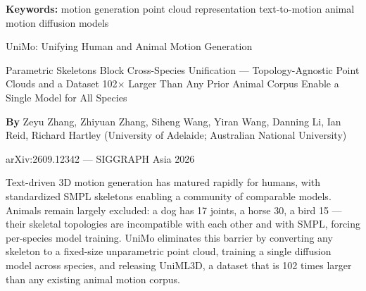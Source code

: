 \documentclass[10pt,twocolumn]{article}
\begin{document}
\setlength{\parindent}{0pt}
\setlength{\parskip}{4pt}

{\small\color{keywordgray}\textbf{Keywords:}
  motion generation \textbullet{}
  point cloud representation \textbullet{}
  text-to-motion \textbullet{}
  animal motion \textbullet{}
  diffusion models}\par\vspace{4pt}

{\LARGE\bfseries\raggedright
  UniMo: Unifying Human and Animal
  Motion Generation}\par\vspace{4pt}

{\large\itshape\raggedright
  Parametric Skeletons Block Cross-Species Unification ---
  Topology-Agnostic Point Clouds and a Dataset 102$\times$ Larger
  Than Any Prior Animal Corpus Enable a Single Model for All
  Species}\par\vspace{6pt}

{\small\textbf{By} Zeyu Zhang, Zhiyuan Zhang, Siheng Wang, Yiran Wang,
  Danning Li, Ian Reid, Richard Hartley
  (University of Adelaide; Australian National University)}\par\vspace{2pt}

{\small\color{keywordgray}arXiv:2609.12342 --- SIGGRAPH Asia 2026}
\par\vspace{2pt}\noindent{\color{rulered}\rule{\columnwidth}{0.6pt}}\vspace{6pt}

Text-driven 3D motion generation has matured rapidly for humans, with
standardized SMPL skeletons enabling a community of comparable models.
Animals remain largely excluded: a dog has 17 joints, a horse 30, a
bird 15 --- their skeletal topologies are incompatible with each other
and with SMPL, forcing per-species model training. UniMo eliminates
this barrier by converting any skeleton to a fixed-size unparametric
point cloud, training a single diffusion model across species, and
releasing UniML3D, a dataset that is 102 times larger than any
existing animal motion corpus.
\end{document}
